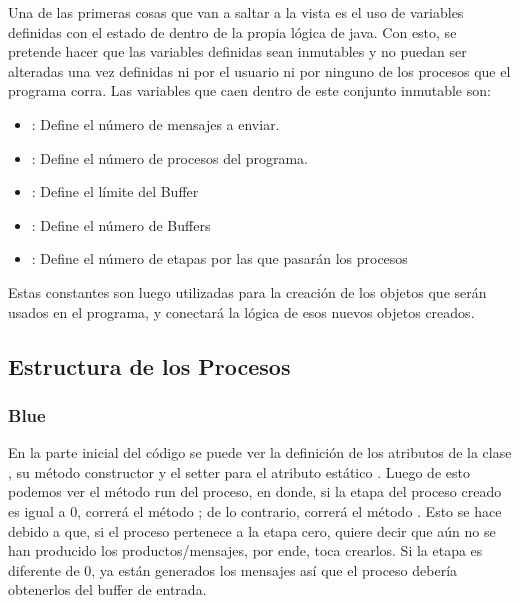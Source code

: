 \documentclass[a4paper]{article}
\begin{document}
    Una de las primeras cosas que van a saltar a la vista es el uso de variables
    definidas con el estado de  dentro de la propia l\'ogica de java.
    Con esto, se pretende hacer que las variables definidas sean inmutables y no puedan ser alteradas una vez definidas ni por el usuario ni por ninguno de los procesos que el programa corra.
    Las variables que caen dentro de este conjunto inmutable son:
    \begin{itemize}
        \item {}: Define el n\'umero de mensajes a enviar.
        \item {}: Define el n\'umero de procesos del programa.
        \item {}: Define el l\'imite del Buffer
        \item {}: Define el n\'umero de Buffers
        \item {}: Define el n\'umero de etapas por las que pasar\'an los procesos
    \end{itemize}

    Estas constantes son luego utilizadas para la creaci\'on de los objetos que ser\'an usados en el programa, y conectar\'a la l\'ogica de esos nuevos objetos creados.

    \subsection{Estructura de los Procesos}

    \subsubsection{Blue}

    En la parte inicial del c\'odigo se puede ver la definici\'on de los atributos de la clase , su m\'etodo constructor y el setter para el atributo est\'atico .
    Luego de esto podemos ver el m\'etodo run del proceso, en donde, si la etapa del proceso creado es igual a 0, correr\'a el m\'etodo ; de lo contrario, correr\'a el m\'etodo .
    Esto se hace debido a que, si el proceso pertenece a la etapa cero, quiere decir que a\'un no se han producido los productos/mensajes, por ende, toca crearlos.
    Si la etapa es diferente de 0, ya est\'an generados los mensajes as\'i que el proceso deber\'ia obtenerlos del buffer de entrada.
\end{document}
